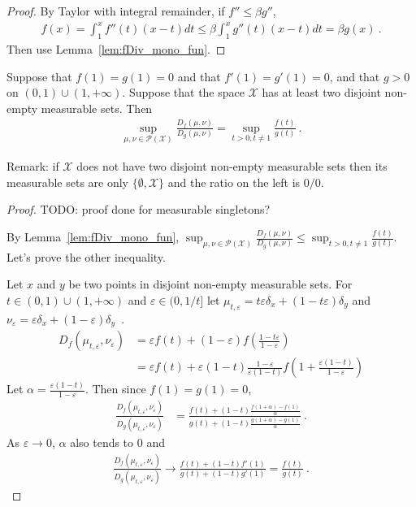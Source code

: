\begin{proof}%
{}
By Taylor with integral remainder, if $f'' \le \beta g''$,
\begin{align*}
f(x) = \int_1^x f''(t) (x - t) dt
\le \beta \int_1^x g''(t) (x - t) dt
= \beta g(x)
\: .
\end{align*}
Then use Lemma~\ref{lem:fDiv_mono_fun}.
\end{proof}


\begin{theorem}
  \label{thm:fDiv_eq_sup_mul_fDiv}
  Suppose that $f(1) = g(1) = 0$ and that $f'(1) = g'(1) = 0$, and that $g>0$ on $(0,1) \cup (1, +\infty)$. Suppose that the space $\mathcal X$ has at least two disjoint non-empty measurable sets. Then
  \begin{align*}
  \sup_{\mu, \nu \in \mathcal P(\mathcal X)} \frac{D_f(\mu, \nu)}{D_g(\mu, \nu)}
  = \sup_{t > 0, t \ne 1} \frac{f(t)}{g(t)}
  \: .
  \end{align*}
\end{theorem}

Remark: if $\mathcal X$ does not have two disjoint non-empty measurable sets then its measurable sets are only $\{\emptyset, \mathcal X\}$ and the ratio on the left is $0/0$.

\begin{proof}%
{}
TODO: proof done for measurable singletons?

By Lemma~\ref{lem:fDiv_mono_fun}, $\sup_{\mu, \nu \in \mathcal P(\mathcal X)} \frac{D_f(\mu, \nu)}{D_g(\mu, \nu)} \le \sup_{t > 0, t \ne 1} \frac{f(t)}{g(t)}$. Let's prove the other inequality.

Let $x$ and $y$ be two points in disjoint non-empty measurable sets. For $t \in (0,1) \cup (1, +\infty)$ and $\varepsilon \in (0, 1/t]$ let $\mu_{t, \varepsilon} = t \varepsilon \delta_x + (1 - t \varepsilon) \delta_y$ and $\nu_\varepsilon = \varepsilon \delta_x + (1 - \varepsilon) \delta_y$~.
\begin{align*}
D_f(\mu_{t, \varepsilon}, \nu_\varepsilon)
&= \varepsilon f(t) + (1 - \varepsilon) f(\frac{1 - t \varepsilon}{1 - \varepsilon})
\\
&= \varepsilon f(t) + \varepsilon (1 - t) \frac{1 - \varepsilon}{\varepsilon (1 - t)} f(1 + \frac{\varepsilon(1 - t)}{1 - \varepsilon})
\end{align*}
Let $\alpha = \frac{\varepsilon (1 - t)}{1 - \varepsilon}$. Then since $f(1) = g(1) = 0$,
\begin{align*}
\frac{D_f(\mu_{t, \varepsilon}, \nu_\varepsilon)}{D_g(\mu_{t, \varepsilon}, \nu_\varepsilon)}
&= \frac{f(t) + (1 - t)\frac{f(1 + \alpha) - f(1)}{\alpha}}{g(t) + (1 - t)\frac{g(1 + \alpha) - g(1)}{\alpha}} \: .
\end{align*}
As $\varepsilon \to 0$, $\alpha$ also tends to 0 and
\begin{align*}
\frac{D_f(\mu_{t, \varepsilon}, \nu_\varepsilon)}{D_g(\mu_{t, \varepsilon}, \nu_\varepsilon)}
\to \frac{f(t) + (1 - t)f'(1)}{g(t) + (1 - t)g'(1)}
= \frac{f(t)}{g(t)}
\: .
\end{align*}
\end{proof}

